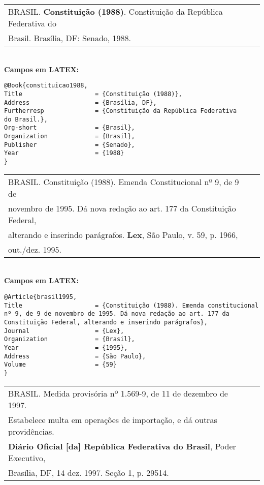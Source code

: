 \begin{tabular}{|l|c|} \hline
	BRASIL. \textbf{Constituição (1988)}. Constituição da República Federativa do \\Brasil. Brasília, DF: Senado, 1988. 
	                                                                                   \\\hline
\end{tabular} \\
	
\textbf{Campos em LATEX:} 
	
\begingroup
\fontsize{10pt}{12pt}\selectfont
\begin{verbatim}
@Book{constituicao1988,
Title                    = {Constituição (1988)},
Address                  = {Brasília, DF},
Furtherresp              = {Constituição da República Federativa 
do Brasil.},
Org-short                = {Brasil},
Organization             = {Brasil},
Publisher                = {Senado},
Year                     = {1988}
}
\end{verbatim}
\endgroup
	
\begin{tabular}{|l|c|} \hline
	BRASIL. Constituição (1988). Emenda Constitucional 
	nº 9, de 9 de                                       \\novembro de 1995. Dá nova redação ao art. 177 da Constituição
	Federal,                                             \\ alterando e inserindo parágrafos. \textbf{Lex}, São Paulo, v. 59, p. 1966, \\out./dez. 1995.  
	                                                     \\\hline
\end{tabular} \\
	
\textbf{Campos em LATEX:} 
	
\begingroup
\fontsize{10pt}{12pt}\selectfont
\begin{verbatim}
@Article{brasil1995,
Title                    = {Constituição (1988). Emenda constitucional 
nº 9, de 9 de novembro de 1995. Dá nova redação ao art. 177 da 
Constituição Federal, alterando e inserindo parágrafos},
Journal                  = {Lex},
Organization             = {Brasil},
Year                     = {1995},
Address                  = {São Paulo},
Volume                   = {59}
}
\end{verbatim}
\endgroup
	
\begin{tabular}{|l|c|} \hline
	BRASIL. Medida provisória nº 1.569-9, de 11 de dezembro de 1997. \\
	Estabelece multa em operações de importação, e dá outras      
	providências.                                                     \\ \textbf{Diário Oficial [da] República Federativa do Brasil},
	Poder Executivo,                                                   \\Brasília, DF, 14 dez. 1997. Seção 1, p. 29514.  
	                                                                   \\\hline
\end{tabular} \\
	
